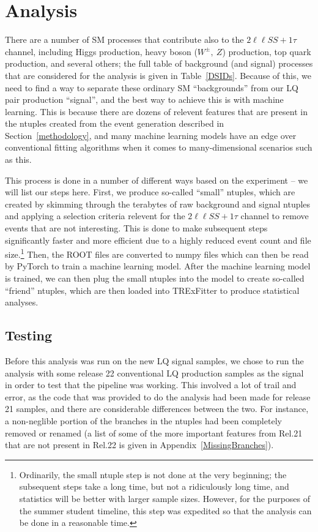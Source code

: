 \section{Analysis}
    There are a number of SM processes that contribute also to the $2\ell\ell SS + 1\tau$ channel, including Higgs production, heavy boson ($W^{\pm},\ Z$) production, top quark production, and several others; the full table of background (and signal) processes that are considered for the analysis is given in Table~\ref{DSIDs}. Because of this, we need to find a way to separate these ordinary SM ``backgrounds'' from our LQ pair production ``signal'', and the best way to achieve this is with machine learning. This is because there are dozens of relevent features that are present in the ntuples created from the event generation described in Section~\ref{methodology}, and many machine learning models have an edge over conventional fitting algorithms when it comes to many-dimensional scenarios such as this.

    This process is done in a number of different ways based on the experiment -- we will list our steps here. First, we produce so-called ``small'' ntuples, which are created by skimming through the terabytes of raw background and signal ntuples and applying a selection criteria relevent for the $2\ell\ell SS + 1\tau$ channel to remove events that are not interesting. This is done to make subsequent steps significantly faster and more efficient due to a highly reduced event count and file size.\footnote{Ordinarily, the small ntuple step is not done at the very beginning; the subsequent steps take a long time, but not a ridiculously long time, and statistics will be better with larger sample sizes. However, for the purposes of the summer student timeline, this step was expedited so that the analysis can be done in a reasonable time.} Then, the ROOT files are converted to numpy files which can then be read by PyTorch to train a machine learning model. After the machine learning model is trained, we can then plug the small ntuples into the model to create so-called ``friend'' ntuples, which are then loaded into TRExFitter to produce statistical analyses.

    \subsection{Testing}
        Before this analysis was run on the new LQ signal samples, we chose to run the analysis with some release 22 conventional LQ production samples as the signal in order to test that the pipeline was working. This involved a lot of trail and error, as the code that was provided to do the analysis had been made for release 21 samples, and there are considerable differences between the two. For instance, a non-neglible portion of the branches in the ntuples had been completely removed or renamed (a list of some of the more important features from Rel.21 that are not present in Rel.22 is given in Appendix~\ref{MissingBranches}).

